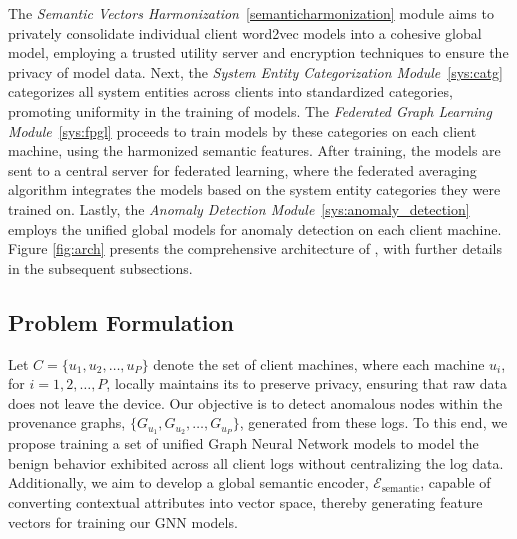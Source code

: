 The \textit{Semantic Vectors Harmonization}~\ref{semanticharmonization} module aims to privately consolidate individual client word2vec models into a cohesive global model, employing a trusted utility server and encryption techniques to ensure the privacy of model data. Next, the \textit{System Entity Categorization Module}~\ref{sys:catg} categorizes all system entities across clients into standardized categories, promoting uniformity in the training of \gnnshort models. The \textit{Federated Graph Learning Module}~\ref{sys:fpgl} proceeds to train \gnnshort models by these categories on each client machine, using the harmonized semantic features. After training, the models are sent to a central server for federated learning, where the federated averaging algorithm integrates the models based on the system entity categories they were trained on. Lastly, the \textit{Anomaly Detection Module}~\ref{sys:anomaly_detection} employs the unified global models for anomaly detection on each client machine. Figure \ref{fig:arch} presents the comprehensive architecture of \Sys, with further details in the subsequent subsections.

\subsection{Problem Formulation}

Let \( C = \{u_1, u_2, \ldots, u_P\} \) denote the set of client machines, where each machine \( u_i \), for \( i = 1, 2, \ldots, P \), locally maintains its \logs to preserve privacy, ensuring that raw data does not leave the device. Our objective is to detect anomalous nodes within the provenance graphs, \( \{G_{u_1}, G_{u_2}, \ldots, G_{u_P}\} \), generated from these logs. To this end, we propose training a set of unified Graph Neural Network models to model the benign behavior exhibited across all client logs without centralizing the log data. Additionally, we aim to develop a global semantic encoder, \( \mathcal{E}_{\text{semantic}} \), capable of converting contextual attributes into vector space, thereby generating feature vectors for training our GNN models.


